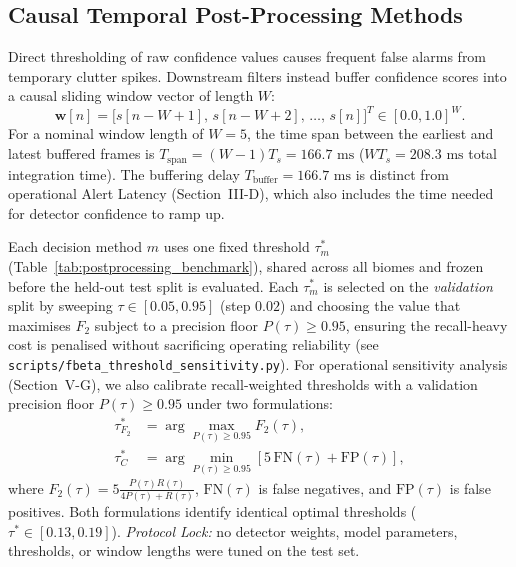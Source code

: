 \documentclass[conference]{IEEEtran}
\begin{document}
\subsection{Causal Temporal Post-Processing Methods}
Direct thresholding of raw confidence values causes frequent false alarms from temporary clutter spikes. Downstream filters instead buffer confidence scores into a causal sliding window vector of length $W$:
\begin{equation}
\mathbf{w}[n] = \big[s[n-W+1], \, s[n-W+2], \, \dots, \, s[n]\big]^T \in [0.0, 1.0]^W.
\label{eq:window_vector}
\end{equation}
For a nominal window length of $W = 5$, the time span between the earliest and latest buffered frames is $T_{\text{span}} = (W-1)T_s = 166.7\text{ ms}$ ($W T_s = 208.3\text{ ms}$ total integration time). The buffering delay $T_{\text{buffer}} = 166.7\text{ ms}$ is distinct from operational Alert Latency (Section~III-D), which also includes the time needed for detector confidence to ramp up.

Each decision method $m$ uses one fixed threshold $\tau_m^*$ (Table~\ref{tab:postprocessing_benchmark}), shared across all biomes and frozen before the held-out test split is evaluated.
Each $\tau_m^*$ is selected on the \emph{validation} split by sweeping $\tau \in [0.05, 0.95]$ (step $0.02$) and choosing the value that maximises $F_2$ subject to a precision floor $P(\tau) \ge 0.95$, ensuring the recall-heavy cost is penalised without sacrificing operating reliability (see \texttt{scripts/fbeta\_threshold\_sensitivity.py}).
For operational sensitivity analysis (Section~V-G), we also calibrate recall-weighted thresholds with a validation precision floor $P(\tau) \ge 0.95$ under two formulations:
\begin{equation}
\begin{aligned}
\tau^*_{F_2} &= \arg\max_{P(\tau) \ge 0.95} F_2(\tau), \\
\tau^*_{C}   &= \arg\min_{P(\tau) \ge 0.95} [5\,\text{FN}(\tau) + \text{FP}(\tau)],
\end{aligned}
\label{eq:fbeta}
\end{equation}
where $F_2(\tau) = 5\frac{P(\tau)R(\tau)}{4 P(\tau) + R(\tau)}$, $\text{FN}(\tau)$ is false negatives, and $\text{FP}(\tau)$ is false positives. Both formulations identify identical optimal thresholds ($\tau^* \in [0.13, 0.19]$). \textit{Protocol Lock:} no detector weights, model parameters, thresholds, or window lengths were tuned on the test set.
\end{document}

